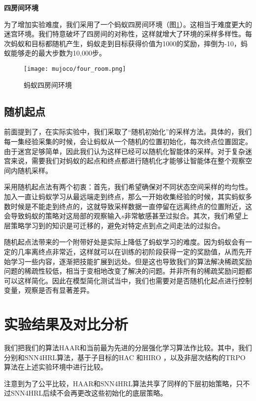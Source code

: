 \vspace{0.5cm}
\textbf{四房间环境}

为了增加实验难度，我们采用了一个蚂蚁四房间环境（图\ref{fig:ant_four_room}）。这相当于难度更大的迷宫环境。我们特意破坏了四房间的对称性，这样就增大了环境的采样多样性。每次蚂蚁和目标都随机产生，蚂蚁走到目标获得价值为1000的奖励，摔倒为-10，蚂蚁能够走的最大步数为10,000步。
\begin{figure}[h]
    \centering
    \texttt{[image: mujoco/four\_room.png]}
    \caption{蚂蚁四房间环境}
    \label{fig:ant_four_room}
\end{figure}

\subsection{随机起点}
前面提到了，在实际实验中，我们采取了``随机初始化''的采样方法。具体的，我们每一集经验采集的时候，会让蚂蚁从一个随机的位置初始化，每次终点位置固定。由于迷宫足够简单，因此我们认为这样已经可以随机化智能体的采样。对于复杂迷宫来说，需要我们对蚂蚁的起点和终点都进行随机化才能够让智能体在整个观察空间内随机采样。

采用随机起点法有两个初衷：首先，我们希望确保对不同状态空间采样的均匀性。加入一直让蚂蚁学习从最远端走到终点，那么一开始收集经验的时候，其实蚂蚁多数时候是不能走到终点的，这就导致采样数据一直停留在远离终点的位置附近，这会导致蚂蚁的策略对这局部的观察输入$s$非常敏感甚至过拟合。其次，我们希望上层策略学习到的知识是可迁移的，避免对特定点到点之间走法的过拟合。

随机起点法带来的一个附带好处是实际上降低了蚂蚁学习的难度。因为蚂蚁会有一定的几率离终点非常近，这样就可以在训练的初阶段获得一定的奖励值，从而先开始学习一些内容，逐渐把技能扩展到远处。但是这也导致我们的算法解决稀疏奖励问题的稀疏性较低，相当于变相地改变了解决的问题。并非所有的稀疏奖励问题都可以这样简化。因此在模型简化测试当中，我们也需要对是否随机化起点进行控制变量，观察是否有显著差异。

\section{实验结果及对比分析}
我们把我们的算法HAAR和当前最为先进的分层强化学习算法作比较。其中，我们分别和SNN4HRL\cite{SNN4hrl}算法，基于子目标的HAC \cite{HAC}和HIRO \cite{HIRO}，以及非层次结构的TRPO\cite{TRPO}算法在上述实验环境中进行比较。

注意到为了公平比较，HAAR和SNN4HRL算法共享了同样的下层初始策略，只不过SNN4HRL后续不会再更改这些初始化的底层策略。

